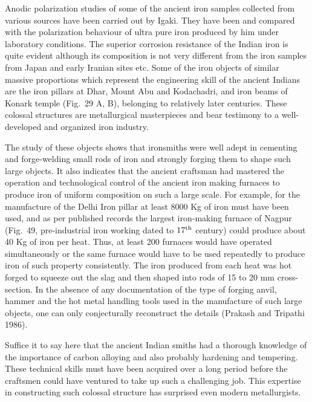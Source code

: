 Anodic polarization studies of some of the ancient iron samples collected from various sources have been carried out by Igaki. They have been and compared with the polarization behaviour of ultra pure iron produced by him under laboratory conditions. The superior corrosion resistance of the Indian iron is quite evident although its composition is not very different from the iron samples from Japan and early Iranian sites etc. Some of the iron objects of similar massive proportions which represent the engineering skill of the ancient Indians are the iron pillars at Dhar, Mount Abu and Kodachadri, and iron beams of Konark temple (Fig.~29 A, B), belonging to relatively later centuries. These colossal structures are metallurgical masterpieces and bear testimony to a well-developed and organized iron industry.

The study of these objects shows that ironsmiths were well adept in cementing and forge-welding small rods of iron and strongly forging them to shape such large objects. It also indicates that the ancient craftsman had mastered the operation and technological control of the ancient iron making furnaces to produce iron of uniform composition on such a large scale. For example, for the manufacture of the Delhi Iron pillar at least 8000 Kg of iron must have been used, and as per published records the largest iron-making furnace of Nagpur (Fig.~49, pre-industrial iron working dated to $17^{\rm th}$ century) could produce about 40 Kg of iron per heat. Thus, at least 200 furnaces would have operated simultaneously or the same furnace would have to be used repeatedly to produce iron of such property consistently. The iron produced from each heat was hot forged to squeeze out the slag and then shaped into rods of 15 to 20 mm cross-section. In the absence of any documentation of the type of forging anvil, hammer and the hot metal handling tools used in the manufacture of such large objects, one can only conjecturally reconstruct the details (Prakash and Tripathi 1986). 

Suffice it to say here that the ancient Indian smiths had a thorough knowledge of the importance of carbon alloying and also probably hardening and tempering. These technical skills must have been acquired over a long period before the craftsmen could have ventured to take up such a challenging job. This expertise in constructing such colossal structure has surprised even modern metallurgists. 

